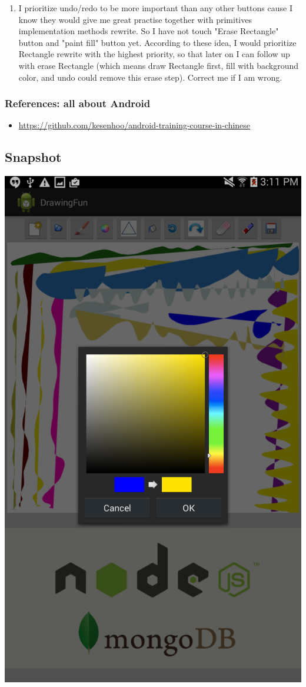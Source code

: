 \documentclass[9pt,b5paper]{article}
\begin{document}
\begin{itemize}
\begin{enumerate}
\item I prioritize undo/redo to be more important than any other buttons cause I know they would give me great practise together with primitives implementation methods rewrite. So I have not touch "Erase Rectangle" button and "paint fill" button yet. According to these idea, I would prioritize Rectangle rewrite with the highest priority, so that later on I can follow up with erase Rectangle (which means draw Rectangle first, fill with background color, and undo could remove this erase step). Correct me if I am wrong.
\end{enumerate}
\end{itemize}

\subsubsection{References: all about Android}
\label{sec-4-2-3}
\begin{itemize}
\item \url{https://github.com/kesenhoo/android-training-course-in-chinese}
\end{itemize}

\subsection{Snapshot}
\label{sec-4-3}
\includegraphics[width=.9\linewidth]{./Screenshot_2014-11-17-15-11-20.png}
\end{document}
